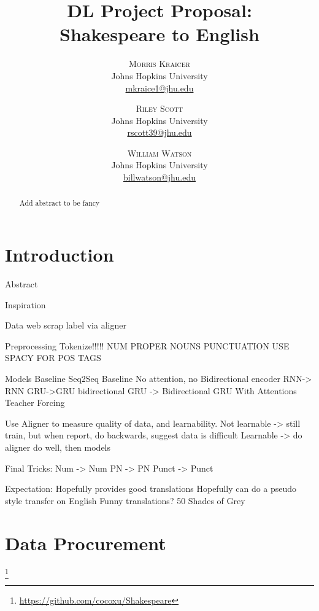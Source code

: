 \documentclass[twoside,twocolumn]{article}
\title{DL Project Proposal:\\Shakespeare to English}
\author{%
\textsc{Morris Kraicer} \\[1ex]
\normalsize Johns Hopkins University \\
\normalsize \href{mailto:mkraice1@jhu.edu}{mkraice1@jhu.edu}
 \and
 \textsc{Riley Scott} \\[1ex]
\normalsize Johns Hopkins University \\
\normalsize \href{mailto:rscott39@jhu.edu}{rscott39@jhu.edu}
 \and
  \textsc{William Watson} \\[1ex]
\normalsize Johns Hopkins University \\
\normalsize \href{mailto:billwatson@jhu.edu}{billwatson@jhu.edu}
}
\date{}%
\begin{document}
\maketitle





\begin{abstract}
\noindent
Add abstract to be fancy
\end{abstract}

\section{Introduction}
Abstract

Inspiration

Data
	web scrap
	label via aligner

Preprocessing
	Tokenize!!!!!
		NUM
		PROPER NOUNS
		PUNCTUATION
		USE SPACY FOR POS TAGS

Models
	Baseline
		Seq2Seq Baseline
			No attention, no Bidirectional
			encoder RNN-> RNN
		GRU->GRU
		bidirectional GRU -> Bidirectional GRU
		With Attentions
		Teacher Forcing

	Use Aligner to measure quality of data, and learnability.
		Not learnable -> still train, but when report, do backwards, suggest data is difficult
		Learnable -> do aligner do well, then models

Final Tricks:
	Num -> Num
	PN -> PN
	Punct -> Punct

Expectation:
	Hopefully provides good translations
	Hopefully can do a pseudo style transfer on English
	Funny translations? 50 Shades of Grey
\section{Data Procurement}
\footnote{\url{https://github.com/cocoxu/Shakespeare}}
\cite{xu2012paraphrasing}
\end{document}
